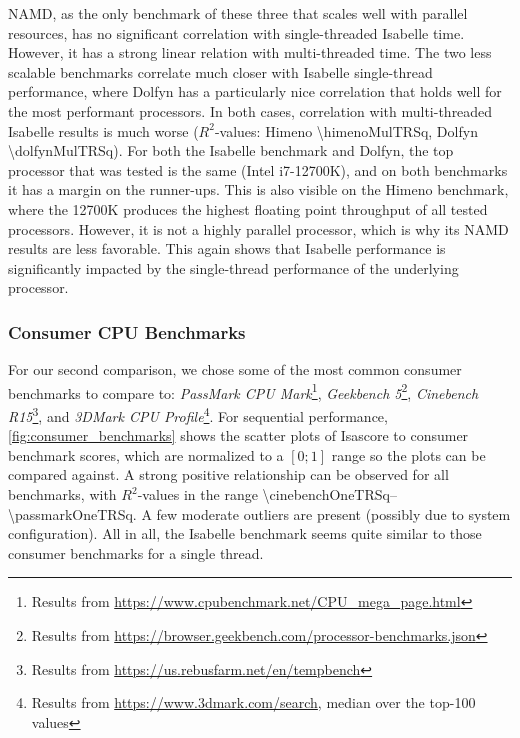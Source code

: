 NAMD, as the only benchmark of these three
that scales well with parallel resources,
has no significant correlation with single-threaded Isabelle time.
However, it has a strong linear relation with multi-threaded time.
The two less scalable benchmarks correlate much closer with Isabelle single-thread performance, where Dolfyn has a particularly nice correlation that holds well for the most performant processors.
In both cases, correlation with multi-threaded Isabelle results is much worse
($R^2$-values: Himeno \num[round-mode=places,round-precision=2]{\himenoMulTRSq}, Dolfyn \num[round-mode=places,round-precision=2]{\dolfynMulTRSq}).
For both the Isabelle benchmark and Dolfyn,
the top processor that was tested is the same
(Intel i7-12700K),
and on both benchmarks it has a margin on the runner-ups.
This is also visible on the Himeno benchmark, where the 12700K produces the highest floating point throughput of all tested processors.
However, it is not a highly parallel processor, which is why its NAMD results are less favorable.
This again shows that Isabelle performance is significantly impacted by the single-thread performance of the underlying processor.

\subsubsection{Consumer CPU Benchmarks}
For our second comparison,
we chose some of the most common consumer benchmarks to compare to:
\emph{PassMark CPU Mark}\footnote{Results from  \url{https://www.cpubenchmark.net/CPU_mega_page.html}}, \emph{Geekbench 5}\footnote{Results from \url{https://browser.geekbench.com/processor-benchmarks.json}}, \emph{Cinebench R15}\footnote{Results from \url{https://us.rebusfarm.net/en/tempbench}}, and \emph{3DMark CPU Profile}\footnote{Results from \url{https://www.3dmark.com/search}, median over the top-\num{100} values}.
For sequential performance,
\autoref{fig:consumer_benchmarks} shows the scatter plots of Isascore to consumer benchmark scores,
which are normalized to a $[0;1]$ range so the plots can be compared against.
A strong positive relationship can be observed for all benchmarks,
with $R^2$-values in the range \numrange[round-mode=places,round-precision=2]{\cinebenchOneTRSq}{\passmarkOneTRSq}.
A few moderate outliers are present (possibly due to system configuration).
All in all, the Isabelle benchmark seems quite similar to those consumer benchmarks for a single thread.



